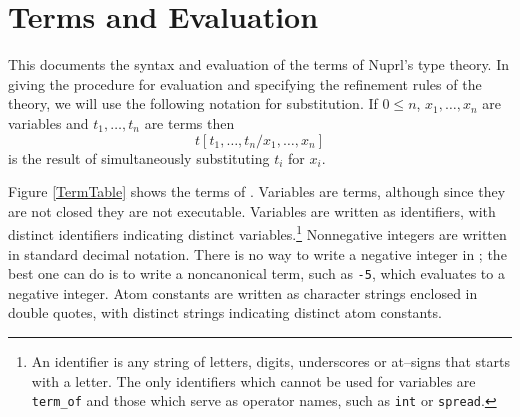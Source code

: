 \section{Terms and Evaluation}

This documents the syntax and evaluation of the terms of Nuprl's type
theory.  In giving the procedure for evaluation and specifying the
refinement rules of the theory, we will use the following notation for
substitution.  If $0\le n$, $x_1,\dots,x_n$ are variables and
$t_1,\dots,t_n$ are terms then \[ t[t_1,\dots, t_n/x_1,\dots,x_n] \]
is the result of simultaneously substituting $t_i$ for $x_i$.  

Figure \ref{TermTable} shows the terms of \nprl{}. 
Variables are terms, although since they are not closed they are not executable.
Variables are written as identifiers, with
distinct identifiers indicating distinct variables.\footnote{
An identifier is any string of letters, digits, underscores or
at--signs that starts with a letter.
The only identifiers which cannot be used for variables are
{\tt term\_of} and those which serve as operator names, such as
{\tt int} or {\tt spread}.
}
Nonnegative integers are written
in standard decimal notation.  There is
no way to write a negative
integer in \nprl{}; the best one can do is to write a noncanonical
term, such as {\tt -5}, which evaluates to a negative integer.
Atom constants are written as character strings enclosed in 
double quotes, with distinct strings indicating distinct atom constants.

